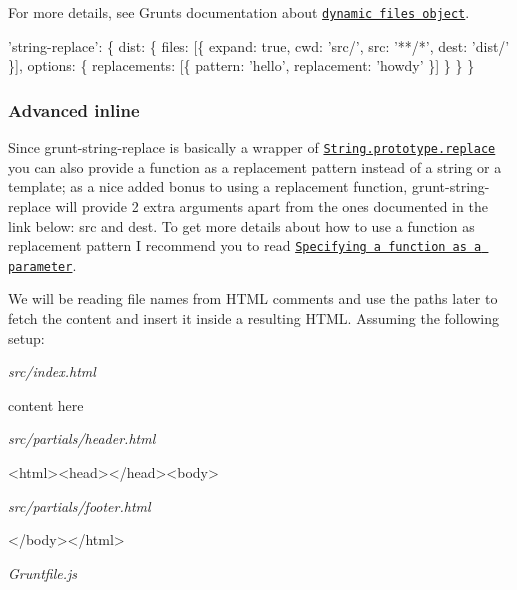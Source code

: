 For more details, see Grunt\textquotesingle{}s documentation about \href{http://gruntjs.com/configuring-tasks#building-the-files-object-dynamically}{\tt dynamic files object}.


\begin{DoxyCode}
'string-replace': \{
  dist: \{
    files: [\{
      expand: true,
      cwd: 'src/',
      src: '**/*',
      dest: 'dist/'
    \}],
    options: \{
      replacements: [\{
        pattern: 'hello',
        replacement: 'howdy'
      \}]
    \}
  \}
\}
\end{DoxyCode}


\subsubsection*{Advanced inline}

Since grunt-\/string-\/replace is basically a wrapper of \href{http://www.ecma-international.org/ecma-262/5.1/#sec-15.5.4.11}{\tt String.\+prototype.\+replace} you can also provide a function as a replacement pattern instead of a string or a template; as a nice added bonus to using a replacement function, grunt-\/string-\/replace will provide 2 extra arguments apart from the ones documented in the link below\+: {\ttfamily src} and {\ttfamily dest}. To get more details about how to use a function as replacement pattern I recommend you to read \href{https://developer.mozilla.org/en-US/docs/JavaScript/Reference/Global_Objects/String/replace#Specifying_a_function_as_a_parameter}{\tt Specifying a function as a parameter}.

We will be reading file names from H\+T\+ML comments and use the paths later to fetch the content and insert it inside a resulting H\+T\+ML. Assuming the following setup\+:

{\itshape src/index.\+html}


\begin{DoxyCode}
content here
\end{DoxyCode}


{\itshape src/partials/header.\+html}


\begin{DoxyCode}
<html><head></head><body>
\end{DoxyCode}


{\itshape src/partials/footer.\+html}


\begin{DoxyCode}
</body></html>
\end{DoxyCode}


{\itshape Gruntfile.\+js}


